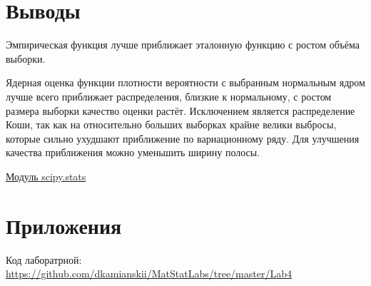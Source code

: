 \documentclass[a4]{article}
\begin{document}
\section{Выводы}
\par Эмпирическая функция лучше приближает эталонную функцию с ростом объёма выборки.

\par Ядерная оценка функции плотности вероятности с выбранным нормальным ядром лучше всего приближает распределения, близкие к нормальному, с ростом размера выборки качество оценки растёт. Исключением является распределение Коши, так как на относительно больших выборках крайне велики выбросы, которые сильно ухудшают приближение по вариационному ряду. Для улучшения качества приближения можно уменьшить ширину полосы.

\begin{thebibliography}{}    
    \href{https://docs.scipy.org/doc/scipy/reference/stats.html}{Модуль scipy.stats}\\
\end{thebibliography}

\section{Приложения}


Код лаборатрной:\; \url{https://github.com/dkamianskii/MatStatLabs/tree/master/Lab4}
\end{document}
